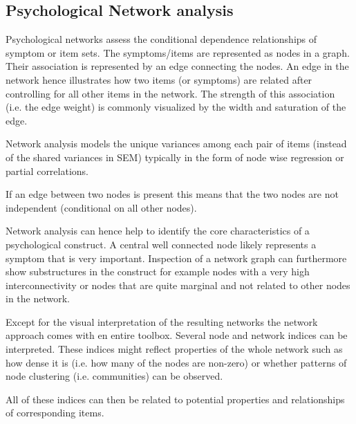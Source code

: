 \subsection{Psychological Network analysis}
Psychological networks assess the conditional dependence relationships of symptom or item sets.
The symptoms/items are represented as nodes in a graph. 
Their association is represented by an edge connecting the nodes.  
An edge in the network hence illustrates how two items (or symptoms) are related after controlling for all other items in the network. The strength of this association (i.e. the edge weight) is commonly visualized by the width and saturation of the edge.

Network analysis models the unique variances among each pair of items (instead of the shared variances in SEM) typically in the form of node wise regression or partial correlations. 

If an edge between two nodes is present this means that the two nodes are not independent (conditional on all other nodes).

Network analysis can hence help to identify the core characteristics of a psychological construct. 
A central well connected node likely represents a symptom that is very important.
Inspection of a network graph can furthermore show substructures in the construct for example nodes with a very high interconnectivity or nodes that are quite marginal and not related to other nodes in the network.

Except for the visual interpretation of the resulting networks the network approach comes with en entire toolbox.
Several node and network indices can be interpreted.
These indices might reflect properties of the whole network  such as how dense it is
(i.e. how many of the nodes are non-zero) or whether patterns of node clustering (i.e. communities) can be observed.

All of these indices can then be related to potential properties and relationships of corresponding items.


